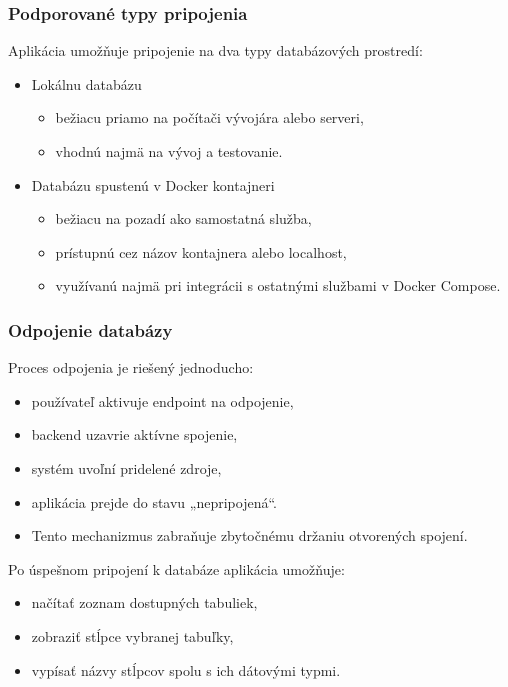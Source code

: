 \documentclass[a4paper, 12pt]{article}
\begin{document}
\subsubsection*{Podporované typy pripojenia}

Aplikácia umožňuje pripojenie na dva typy databázových prostredí:
\begin{itemize}
    \item Lokálnu databázu
    \begin{itemize}
        \item bežiacu priamo na počítači vývojára alebo serveri,
        \item vhodnú najmä na vývoj a testovanie.
    \end{itemize}
    \item Databázu spustenú v Docker kontajneri
    \begin{itemize}
        \item bežiacu na pozadí ako samostatná služba,
        \item prístupnú cez názov kontajnera alebo localhost,
        \item využívanú najmä pri integrácii s ostatnými službami v Docker Compose.
    \end{itemize}
\end{itemize}

\subsubsection*{Odpojenie databázy}

Proces odpojenia je riešený jednoducho:
\begin{itemize}
    \item používateľ aktivuje endpoint na odpojenie,
    \item backend uzavrie aktívne spojenie,
    \item systém uvoľní pridelené zdroje,
    \item aplikácia prejde do stavu „nepripojená“.
    \item Tento mechanizmus zabraňuje zbytočnému držaniu otvorených spojení.
\end{itemize}

\noindent
Po úspešnom pripojení k databáze aplikácia umožňuje:
\begin{itemize}
    \item načítať zoznam dostupných tabuliek,
    \item zobraziť stĺpce vybranej tabuľky,
    \item vypísať názvy stĺpcov spolu s ich dátovými typmi.
\end{itemize}
\end{document}
